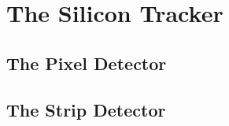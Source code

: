 \section{The Silicon Tracker}\label{sec:tracker}

\subsection{The Pixel Detector}\label{subsec:pixel}

\subsection{The Strip Detector}\label{subsec:strip}